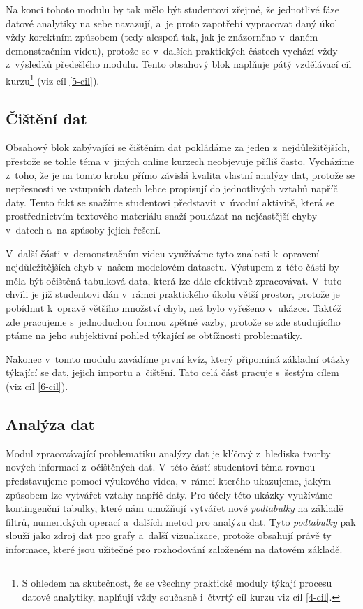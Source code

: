 Na konci tohoto modulu by tak mělo být studentovi zřejmé, že jednotlivé fáze datové analytiky na sebe navazují, a~je proto zapotřebí vypracovat daný úkol vždy korektním způsobem (tedy alespoň tak, jak je znázorněno v~daném demonstračním videu), protože se v~dalších praktických částech vychází vždy z~výsledků předešlého modulu. Tento obsahový blok naplňuje pátý vzdělávací cíl kurzu\footnote{S ohledem na skutečnost, že se všechny praktické moduly týkají procesu datové analytiky, naplňují vždy současně i~čtvrtý cíl kurzu viz cíl \ref{4-cil}.} (viz cíl \ref{5-cil}).

\hypertarget{ux10diux161tux11bnuxed-dat}{%
\subsection{Čištění dat}\label{ux10diux161tux11bnuxed-dat}}

Obsahový blok zabývající se čištěním dat pokládáme za jeden z~nejdůležitějších, přestože se tohle téma v~jiných online kurzech neobjevuje příliš často. Vycházíme z~toho, že je na tomto kroku přímo závislá kvalita vlastní analýzy dat, protože se nepřesnosti ve vstupních datech lehce propisují do jednotlivých vztahů napříč daty. Tento fakt se snažíme studentovi představit v~úvodní aktivitě, která se prostřednictvím textového materiálu snaží poukázat na nejčastější chyby v~datech a~na způsoby jejich řešení.

V~další části v~demonstračním videu využíváme tyto znalosti k~opravení nejdůležitějších chyb v~našem modelovém datasetu. Výstupem z~této části by měla být očištěná tabulková data, která lze dále efektivně zpracovávat. V~tuto chvíli je již studentovi dán v~rámci praktického úkolu větší prostor, protože je pobídnut k~opravě většího množství chyb, než bylo vyřešeno v~ukázce. Taktéž zde pracujeme s~jednoduchou formou zpětné vazby, protože se zde studujícího ptáme na jeho subjektivní pohled týkající se obtížnosti problematiky.

Nakonec v~tomto modulu zavádíme první kvíz, který připomíná základní otázky týkající se dat, jejich importu a~čištění. Tato celá část pracuje s~šestým cílem (viz cíl \ref{6-cil}).

\hypertarget{analuxfdza-dat}{%
\subsection{Analýza dat}\label{analuxfdza-dat}}

Modul zpracovávající problematiku analýzy dat je klíčový z~hlediska tvorby nových informací z~očištěných dat. V~této částí studentovi téma rovnou představujeme pomocí výukového videa, v~rámci kterého ukazujeme, jakým způsobem lze vytvářet vztahy napříč daty. Pro účely této ukázky využíváme kontingenční tabulky, které nám umožňují vytvářet nové \emph{podtabulky} na základě filtrů, numerických operací a~dalších metod pro analýzu dat. Tyto \emph{podtabulky} pak slouží jako zdroj dat pro grafy a~další vizualizace, protože obsahují právě ty informace, které jsou užitečné pro rozhodování založeném na datovém základě.

